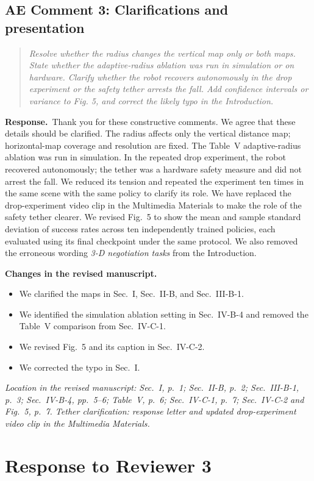 \documentclass[11pt]{article}
\newenvironment{reviewcomment}{\begin{quote}\color{reviewblue}\itshape}{\end{quote}}
\newcommand{\Response}{\par\noindent\textbf{Response.}\ }
\newcommand{\Changes}{\par\noindent\textbf{Changes in the revised manuscript.}\ }
\newcommand{\Location}[1]{\par\noindent\textit{Location in the revised manuscript: #1}}
\begin{document}
\subsection*{AE Comment 3: Clarifications and presentation}
\begin{reviewcomment}
Resolve whether the radius changes the vertical map only or both maps. State whether the adaptive-radius ablation was run in simulation or on hardware. Clarify whether the robot recovers autonomously in the drop experiment or the safety tether arrests the fall. Add confidence intervals or variance to Fig. 5, and correct the likely typo in the Introduction.
\end{reviewcomment}
\Response Thank you for these constructive comments. We agree that these details should be clarified. The radius affects only the vertical distance map; horizontal-map coverage and resolution are fixed. The Table~V adaptive-radius ablation was run in simulation. In the repeated drop experiment, the robot recovered autonomously; the tether was a hardware safety measure and did not arrest the fall. We reduced its tension and repeated the experiment ten times in the same scene with the same policy to clarify its role. We have replaced the drop-experiment video clip in the Multimedia Materials to make the role of the safety tether clearer. We revised Fig.~5 to show the mean and sample standard deviation of success rates across ten independently trained policies, each evaluated using its final checkpoint under the same protocol. We also removed the erroneous wording \textit{3-D negotiation tasks} from the Introduction.
\Changes
\begin{itemize}
    \item We clarified the maps in Sec.~I, Sec.~II-B, and Sec.~III-B-1.
    \item We identified the simulation ablation setting in Sec.~IV-B-4 and removed the Table~V comparison from Sec.~IV-C-1.
    \item We revised Fig.~5 and its caption in Sec.~IV-C-2.
    \item We corrected the typo in Sec.~I.
\end{itemize}


\Location{Sec.~I, p.~1; Sec.~II-B, p.~2; Sec.~III-B-1, p.~3; Sec.~IV-B-4, pp.~5--6; Table~V, p.~6; Sec.~IV-C-1, p.~7; Sec.~IV-C-2 and Fig.~5, p.~7. Tether clarification: response letter and updated drop-experiment video clip in the Multimedia Materials.}

\clearpage
\section*{Response to Reviewer 3}
\end{document}
